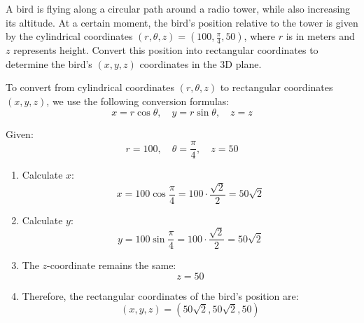 \exampleline
\begin{example}
A bird is flying along a circular path around a radio tower, while also increasing its altitude. At a certain moment, the bird’s position relative to the tower is given by the cylindrical coordinates \( (r, \theta, z) = (100, \frac{\pi}{4}, 50) \), where \( r \) is in meters and \( z \) represents height. Convert this position into rectangular coordinates to determine the bird’s \( (x, y, z) \) coordinates in the 3D plane.

\begin{solution}
To convert from cylindrical coordinates \( (r, \theta, z) \) to rectangular coordinates \( (x, y, z) \), we use the following conversion formulas:
\[
x = r \cos \theta, \quad y = r \sin \theta, \quad z = z
\]

Given:
\[
r = 100, \quad \theta = \frac{\pi}{4}, \quad z = 50
\]

\begin{enumerate}
    \item Calculate \( x \):
    \[
    x = 100 \cos \frac{\pi}{4} = 100 \cdot \frac{\sqrt{2}}{2} = 50 \sqrt{2}
    \]

    \item Calculate \( y \):
    \[
    y = 100 \sin \frac{\pi}{4} = 100 \cdot \frac{\sqrt{2}}{2} = 50 \sqrt{2}
    \]

    \item The \( z \)-coordinate remains the same:
    \[
    z = 50
    \]

    \item Therefore, the rectangular coordinates of the bird’s position are:
    \[
    (x, y, z) = \left( 50 \sqrt{2}, 50 \sqrt{2}, 50 \right)
    \]
\end{enumerate}

\end{solution}
\end{example}
\exampleline
